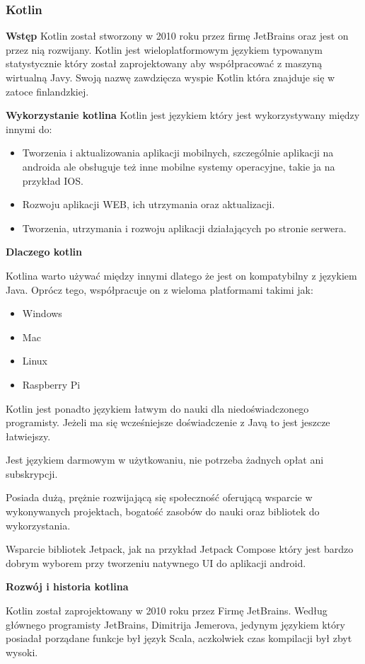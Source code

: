 \subsubsection{Kotlin}

\textbf{Wstęp}
Kotlin został stworzony w 2010 roku przez firmę JetBrains oraz jest on przez nią rozwijany. Kotlin jest wieloplatformowym językiem typowanym statystycznie który został zaprojektowany aby współpracować z maszyną wirtualną Javy. Swoją nazwę zawdzięcza wyspie Kotlin która znajduje się w zatoce finlandzkiej.

\textbf{Wykorzystanie kotlina}
Kotlin jest językiem który jest wykorzystywany między innymi do:
\begin{itemize}
	\item Tworzenia i aktualizowania aplikacji mobilnych, szczególnie aplikacji na androida ale obsługuje też inne mobilne systemy operacyjne, takie ja na przykład IOS.
	\item Rozwoju aplikacji WEB, ich utrzymania oraz aktualizacji.
	\item Tworzenia, utrzymania i rozwoju aplikacji działających po stronie serwera.
\end{itemize}

\textbf{Dlaczego kotlin}

Kotlina warto używać między innymi dlatego że jest on kompatybilny z językiem Java. Oprócz tego, współpracuje on z wieloma platformami takimi jak:
\begin{itemize}
	\item Windows
	\item Mac
	\item Linux
	\item Raspberry Pi
\end{itemize}
Kotlin jest ponadto językiem łatwym do nauki dla niedoświadczonego programisty. Jeżeli ma się wcześniejsze doświadczenie z Javą to jest jeszcze łatwiejszy.

Jest językiem darmowym w użytkowaniu, nie potrzeba żadnych opłat ani subskrypcji.

Posiada dużą, prężnie rozwijającą się społeczność oferującą wsparcie w wykonywanych projektach, bogatość zasobów do nauki oraz bibliotek do wykorzystania.

Wsparcie bibliotek Jetpack, jak na przykład Jetpack Compose który jest bardzo dobrym wyborem przy tworzeniu natywnego UI do aplikacji android.

\textbf{Rozwój i historia kotlina}

Kotlin został zaprojektowany w 2010 roku przez Firmę JetBrains. Według głównego programisty JetBrains, Dimitrija Jemerova, jedynym językiem który posiadał porządane funkcje był język Scala, aczkolwiek czas kompilacji był zbyt wysoki.

